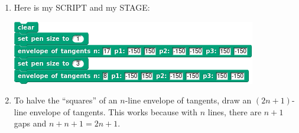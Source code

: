 \documentclass[noauthor,nooutcomes,hints,handout]{ximera}
\begin{document}
\begin{question}
\begin{freeResponse}
\begin{enumerate}
\begin{center}
      \end{center}
    \item Here is my SCRIPT and my STAGE:
      \begin{center}
        \includegraphics[width=.3\textwidth]{8-17-lineOfTanScript.png}\qquad{}
      \end{center}
    \item To halve the ``squares'' of an $n$-line envelope of
      tangents, draw an $(2n+1)$-line envelope of tangents. This works
      because with $n$ lines, there are $n+1$ gaps and $n + n+1 =
      2n+1$.
    \end{enumerate}
  \end{freeResponse}
\end{question}
\end{document}
